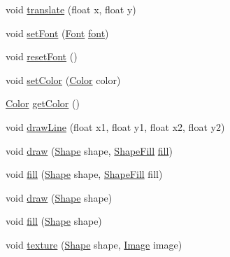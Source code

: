 \begin{DoxyCompactItemize}
\item 
void \mbox{\hyperlink{classorg_1_1newdawn_1_1slick_1_1_graphics_ad75589e65f1d524870c0b719172ba065}{translate}} (float x, float y)
\item 
void \mbox{\hyperlink{classorg_1_1newdawn_1_1slick_1_1_graphics_a610ac6be8d21ad1d5129c66b6a32f1bf}{set\+Font}} (\mbox{\hyperlink{interfaceorg_1_1newdawn_1_1slick_1_1_font}{Font}} \mbox{\hyperlink{classorg_1_1newdawn_1_1slick_1_1_graphics_a3fc899a622817cc89e2c9f0111243b65}{font}})
\item 
void \mbox{\hyperlink{classorg_1_1newdawn_1_1slick_1_1_graphics_a4d4a5938813dd8e57c53a38f25dc771f}{reset\+Font}} ()
\item 
void \mbox{\hyperlink{classorg_1_1newdawn_1_1slick_1_1_graphics_a725360b8b6c1b50306fe2e8ff4ed44fd}{set\+Color}} (\mbox{\hyperlink{classorg_1_1newdawn_1_1slick_1_1_color}{Color}} color)
\item 
\mbox{\hyperlink{classorg_1_1newdawn_1_1slick_1_1_color}{Color}} \mbox{\hyperlink{classorg_1_1newdawn_1_1slick_1_1_graphics_a13cd0f941d19d8b8fced63cc47728e7d}{get\+Color}} ()
\item 
void \mbox{\hyperlink{classorg_1_1newdawn_1_1slick_1_1_graphics_ac889330d5c5b2b787db5a21ae3fc90ae}{draw\+Line}} (float x1, float y1, float x2, float y2)
\item 
void \mbox{\hyperlink{classorg_1_1newdawn_1_1slick_1_1_graphics_aa45e5bb37cfea7d888b338180b0d5bd4}{draw}} (\mbox{\hyperlink{classorg_1_1newdawn_1_1slick_1_1geom_1_1_shape}{Shape}} shape, \mbox{\hyperlink{interfaceorg_1_1newdawn_1_1slick_1_1_shape_fill}{Shape\+Fill}} \mbox{\hyperlink{classorg_1_1newdawn_1_1slick_1_1_graphics_a7c694d58339cd5e41270cb46aa52929c}{fill}})
\item 
void \mbox{\hyperlink{classorg_1_1newdawn_1_1slick_1_1_graphics_a7c694d58339cd5e41270cb46aa52929c}{fill}} (\mbox{\hyperlink{classorg_1_1newdawn_1_1slick_1_1geom_1_1_shape}{Shape}} shape, \mbox{\hyperlink{interfaceorg_1_1newdawn_1_1slick_1_1_shape_fill}{Shape\+Fill}} fill)
\item 
void \mbox{\hyperlink{classorg_1_1newdawn_1_1slick_1_1_graphics_af8e80c71c83cd2c56f936d5867f0f733}{draw}} (\mbox{\hyperlink{classorg_1_1newdawn_1_1slick_1_1geom_1_1_shape}{Shape}} shape)
\item 
void \mbox{\hyperlink{classorg_1_1newdawn_1_1slick_1_1_graphics_a878d7180ec903dab22016badb27a202a}{fill}} (\mbox{\hyperlink{classorg_1_1newdawn_1_1slick_1_1geom_1_1_shape}{Shape}} shape)
\item 
void \mbox{\hyperlink{classorg_1_1newdawn_1_1slick_1_1_graphics_a3139bc656ae2e7d8d5e974300ace7895}{texture}} (\mbox{\hyperlink{classorg_1_1newdawn_1_1slick_1_1geom_1_1_shape}{Shape}} shape, \mbox{\hyperlink{classorg_1_1newdawn_1_1slick_1_1_image}{Image}} image)

\end{DoxyCompactItemize}
